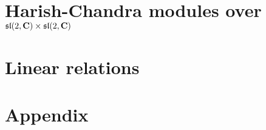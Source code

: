 \documentclass[]{./Bachelor}
\begin{document}
\frontmatter




\tableofcontents*

\mainmatter
\clearpage
\pagestyle{ruled}

\chapter{Harish-Chandra modules over $\mathfrak{sl}(2,\mathbf{C})\times \mathfrak{sl}(2,\mathbf{C})$}\nocite{*}
\label{cha:first}



\chapter{Linear relations}
\label{cha:second}

\medskip

\printbibliography


\appendix

\chapter{Appendix}

\kant
\end{document}
